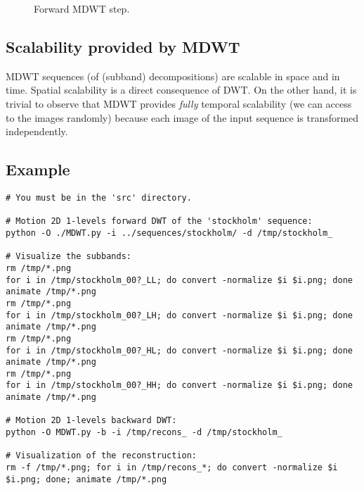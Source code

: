\begin{figure}
\centering
{}
\caption{Forward MDWT step.}
\end{figure}



\subsection{Scalability provided by MDWT}
MDWT sequences (of (subband) decompositions) are scalable in space and
in time. Spatial scalability is a direct consequence of DWT. On the other
hand, it is trivial to observe that MDWT provides \emph{fully}
temporal scalability (we can access to the images randomly) because
each image of the input sequence is transformed independently.

\subsection{Example}
\begin{verbatim}
# You must be in the 'src' directory.

# Motion 2D 1-levels forward DWT of the 'stockholm' sequence:
python -O ./MDWT.py -i ../sequences/stockholm/ -d /tmp/stockholm_

# Visualize the subbands:
rm /tmp/*.png
for i in /tmp/stockholm_00?_LL; do convert -normalize $i $i.png; done
animate /tmp/*.png
rm /tmp/*.png
for i in /tmp/stockholm_00?_LH; do convert -normalize $i $i.png; done
animate /tmp/*.png
rm /tmp/*.png
for i in /tmp/stockholm_00?_HL; do convert -normalize $i $i.png; done
animate /tmp/*.png
rm /tmp/*.png
for i in /tmp/stockholm_00?_HH; do convert -normalize $i $i.png; done
animate /tmp/*.png

# Motion 2D 1-levels backward DWT:
python -O MDWT.py -b -i /tmp/recons_ -d /tmp/stockholm_

# Visualization of the reconstruction:
rm -f /tmp/*.png; for i in /tmp/recons_*; do convert -normalize $i $i.png; done; animate /tmp/*.png
\end{verbatim}


